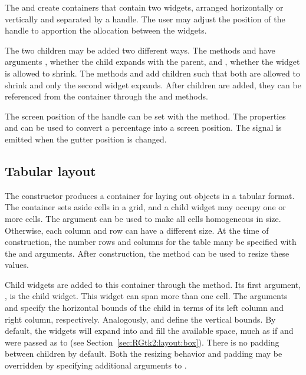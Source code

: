 The  and  create
containers that contain two widgets, arranged horizontally or
vertically and separated by a handle.  The user may adjust the
position of the handle to apportion the allocation between the
widgets.

The two children may be added two different ways. The methods
 and  have arguments
, whether the child expands with the
parent, and , whether the widget is
allowed to shrink. The methods  and
 add children such that both are allowed to
shrink and only the second widget expands.  After children are added,
they can be referenced from the container through the
 and  methods.

The screen position of the handle can be set with the
 method.  The properties
 and  can be used to convert a
percentage into a screen position. The  signal is
emitted when the gutter position is changed.




\subsection{Tabular layout}
\label{sec:RGtk2:gtkTable}

The  constructor produces a container for laying
out objects in a tabular format. The container sets aside cells in a
grid, and a child widget may occupy one or more cells. The
 argument can be used to make all
cells homogeneous in size. Otherwise, each column and row can have a
different size. At the time of construction, the number rows and
columns for the table many be specified with the
 and 
arguments. After construction, the  method
can be used to resize these values.

Child widgets are added to this container through the
 method. Its first argument,
, is the child widget. This widget can
span more than one cell. The arguments
 and
 specify the horizontal bounds
of the child in terms of its left column and right column,
respectively. Analogously,  and
 define the vertical bounds.
By default, the widgets will expand into and fill the available space,
much as if  and
 were passed as  to
 (see
Section~\ref{sec:RGtk2:layout:box}). There is no padding between
children by default. Both the resizing behavior and padding may be
overridden by specifying additional arguments to
.

